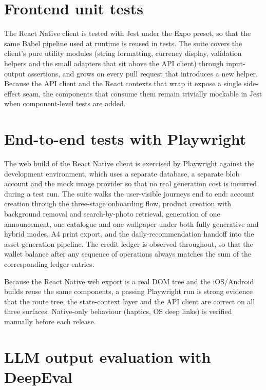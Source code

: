 \section{Frontend unit tests}
\label{sec:frontend-tests}

The React Native client is tested with Jest under the Expo preset, so that the same Babel pipeline used at runtime is reused in tests. The suite covers the client's pure utility modules (string formatting, currency display, validation helpers and the small adapters that sit above the API client) through input-output assertions, and grows on every pull request that introduces a new helper. Because the API client and the React contexts that wrap it expose a single side-effect seam, the components that consume them remain trivially mockable in Jest when component-level tests are added.

\section{End-to-end tests with Playwright}
\label{sec:client-tests}

The web build of the React Native client is exercised by Playwright against the development environment, which uses a separate database, a separate blob account and the mock image provider so that no real generation cost is incurred during a test run. The suite walks the user-visible journeys end to end: account creation through the three-stage onboarding flow, product creation with background removal and search-by-photo retrieval, generation of one announcement, one catalogue and one wallpaper under both fully generative and hybrid modes, A4 print export, and the daily-recommendation handoff into the asset-generation pipeline. The credit ledger is observed throughout, so that the wallet balance after any sequence of operations always matches the sum of the corresponding ledger entries.

Because the React Native web export is a real DOM tree and the iOS/Android builds reuse the same components, a passing Playwright run is strong evidence that the route tree, the state-context layer and the API client are correct on all three surfaces. Native-only behaviour (haptics, OS deep links) is verified manually before each release.

\section{LLM output evaluation with DeepEval}
\label{sec:llm-eval}

